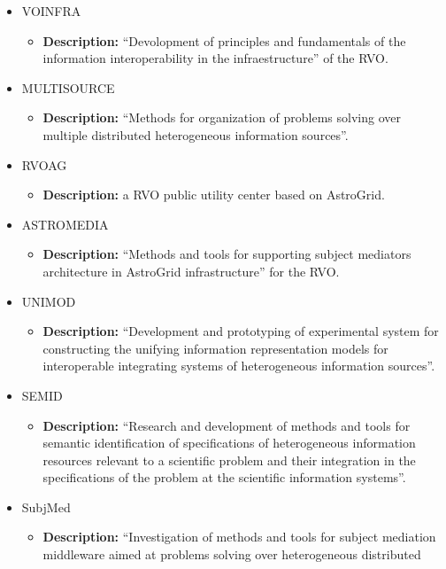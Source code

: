 \begin{itemize}
\begin{itemize}
\begin{itemize}
\end{itemize}
\item VOINFRA
\begin{itemize}
\item \textbf{Description:} ``Devolopment of principles and fundamentals of the
information interoperability in the infraestructure'' of the RVO.
\end{itemize}
\item MULTISOURCE
\begin{itemize}
\item \textbf{Description:} ``Methods for organization of problems solving over
multiple distributed he\-te\-ro\-ge\-neous information sources''.
\end{itemize}
\item RVOAG
\begin{itemize}
\item \textbf{Description:} a RVO public utility center based on AstroGrid.
\end{itemize}
\item ASTROMEDIA
\begin{itemize}
\item \textbf{Description:} ``Methods and tools for supporting subject mediators
architecture in AstroGrid infrastructure'' for the RVO.
\end{itemize}
\item UNIMOD
\begin{itemize}
\item \textbf{Description:} ``Development and prototyping of experimental system
for constructing the unifying information representation models for
interoperable integrating systems of heterogeneous information sources''.
\end{itemize}
\item SEMID
\begin{itemize}
\item \textbf{Description:} ``Research and development of methods and tools for
semantic identification of specifications of heterogeneous information resources
relevant to a scientific problem and their integration in the specifications of
the problem at the scientific information systems''.
\end{itemize}
\item SubjMed
\begin{itemize}
\item \textbf{Description:} ``Investigation of methods and tools for subject
mediation middleware aimed at problems solving over heterogeneous distributed

\end{itemize}
\end{itemize}
\end{itemize}
